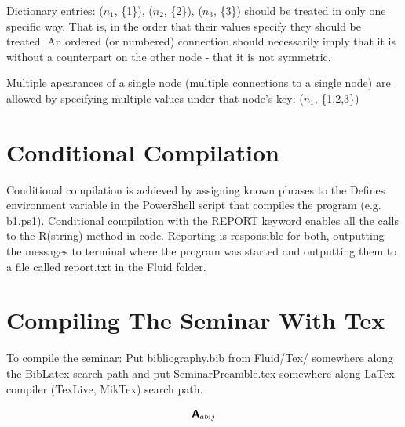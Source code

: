 Dictionary entries: ($n_1$, \{1\}), ($n_2$, \{2\}), ($n_3$, \{3\}) should be treated in only one specific way. That is, in the order that their values specify they should be treated. An ordered (or numbered) connection should necessarily imply that it is without a counterpart on the other node - that it is not symmetric.

Multiple apearances of a single node (multiple connections to a single node) are allowed by specifying multiple values under that node's key: ($n_1$, \{1,2,3\})

\setlength{\textheight}{26.4cm}
\pagebreak
\setlength{\topmargin}{1.6cm}			%
\setlength{\headheight}{0.0cm}
\setlength{\headsep}{0.0cm}			%
\fancyhf{}
\fancyfoot[C]{\thepage}

\section{Conditional Compilation}

Conditional compilation is achieved by assigning known phrases to the Defines environment variable in the PowerShell script that compiles the program (e.g. b1.ps1). Conditional compilation with the REPORT keyword enables all the calls to the R(string) method in code. Reporting is responsible for both, outputting the messages to terminal where the program was started and outputting them to a file called report.txt in the Fluid folder.

\section{Compiling The Seminar With Tex}

To compile the seminar: Put bibliography.bib from Fluid/Tex/ somewhere along the BibLatex search path and put SeminarPreamble.tex somewhere along LaTex compiler (TexLive, MikTex) search path.

\begin{equation*}
   \bm{\mathsf{A}}_{abij}
\end{equation*}

